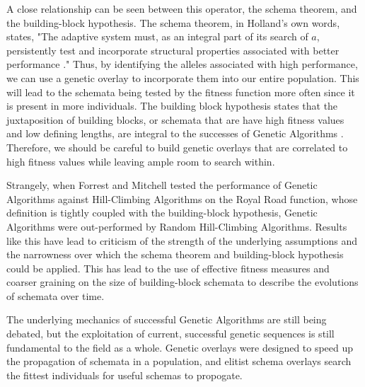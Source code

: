%
%
A close relationship can be seen between this operator, the schema theorem, and the building-block hypothesis\cite{Goldberg89, Holland75}. The schema theorem, in Holland's own words, states, "The adaptive system must, as an integral part of its search of $a$, persistently test and incorporate structural properties associated with better performance \cite{Holland75}." Thus, by identifying the alleles associated with high performance, we can use a genetic overlay to incorporate them into our entire population. This will lead to the schemata being tested by the fitness function more often since it is present in more individuals. The building block hypothesis states that the juxtaposition of building blocks, or schemata that are have high fitness values and low defining lengths, are integral to the successes of Genetic Algorithms \cite{Goldberg89}. Therefore, we should be careful to build genetic overlays that are correlated to high fitness values while leaving ample room to search within.

Strangely, when Forrest and Mitchell tested the performance of Genetic Algorithms against Hill-Climbing Algorithms on the Royal Road function, whose definition is tightly coupled with the building-block hypothesis, Genetic Algorithms were out-performed\cite{Forrest93} by Random Hill-Climbing Algorithms. Results like this have lead to criticism of the strength of the underlying assumptions and the narrowness over which the schema theorem and building-block hypothesis could be applied\cite{Burjorjee08, Senaratna05}. This has lead to the use of effective fitness measures and coarser graining on the size of building-block schemata to describe the evolutions of schemata over time\cite{Stephens99}.

The underlying mechanics of successful Genetic Algorithms are still being debated, but the exploitation of current, successful genetic sequences is still fundamental to the field as a whole\cite{Russell10, Senaratna05}. Genetic overlays were designed to speed up the propagation of schemata in a population, and elitist schema overlays search the fittest individuals for useful schemas to propogate.
